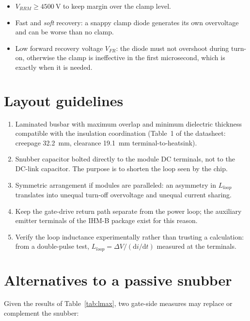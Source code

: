 \documentclass[11pt,a4paper]{article}
\begin{document}
\begin{itemize}[nosep]
\item $V_{RRM} \ge \SI{4500}{\volt}$ to keep margin over the clamp level.
\item Fast and \emph{soft} recovery: a snappy clamp diode generates its own
      overvoltage and can be worse than no clamp.
\item Low forward recovery voltage $V_{FR}$: the diode must not overshoot
      during turn-on, otherwise the clamp is ineffective in the first
      microsecond, which is exactly when it is needed.
\end{itemize}

\section{Layout guidelines}

\begin{enumerate}[nosep]
\item Laminated busbar with maximum overlap and minimum dielectric thickness
      compatible with the insulation coordination
      (Table~1 of the datasheet: creepage \SI{32.2}{\milli\metre}, clearance
      \SI{19.1}{\milli\metre} terminal-to-heatsink).
\item Snubber capacitor bolted directly to the module DC terminals, not to the
      DC-link capacitor. The purpose is to shorten the loop seen by the chip.
\item Symmetric arrangement if modules are paralleled: an asymmetry in
      $L_{loop}$ translates into unequal turn-off overvoltage and unequal
      current sharing.
\item Keep the gate-drive return path separate from the power loop; the
      auxiliary emitter terminals of the IHM-B package exist for this reason.
\item Verify the loop inductance experimentally rather than trusting a
      calculation: from a double-pulse test,
      $L_{loop} = \Delta V / (\mathrm{d}i/\mathrm{d}t)$ measured at the
      terminals.
\end{enumerate}

\section{Alternatives to a passive snubber}

Given the results of Table~\ref{tab:lmax}, two gate-side measures may replace
or complement the snubber:
\end{document}
